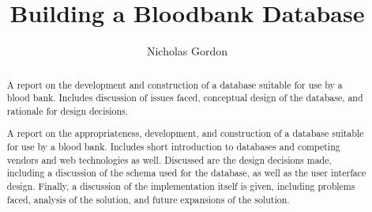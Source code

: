 \documentclass[runningheads,a4paper]{llncs}
\begin{document}


\title{Building a Bloodbank Database}

\author{Nicholas Gordon}

%
\iffalse
\author{Firstname Lastname\inst{1} \and Firstname Lastname\inst{2} }

\institute{
Insitute 1\\
\email{...}\and
Insitute 2\\
\email{...}
}
\fi
			
\maketitle

\begin{abstract}
  A report on the development and construction of a database suitable for use by a blood bank. Includes discussion of issues faced, conceptual design of the database, and rationale for design decisions.

  A report on the appropriateness, development, and construction of a database suitable for use by a blood bank. Includes short introduction to databases and competing vendors and web technologies as well. Discussed are the design decisions made, including a discussion of the schema used for the database, as well as the user interface design. Finally, a discussion of the implementation itself is given, including problems faced, analysis of the solution, and future expansions of the solution.
\end{abstract}


\end{document}
